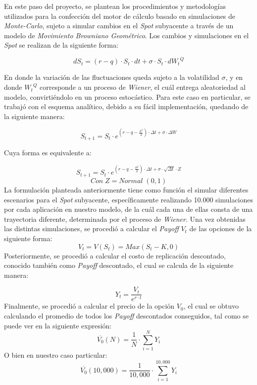 \noindent En este paso del proyecto, se plantean los procedimientos y metodologías utilizados para la confección del motor de cálculo basado en simulaciones de \textit{Monte-Carlo}, sujeto a simular cambios en el \textit{Spot} subyacente a través de un modelo de \textit{Movimiento Browniano Geométrico}. Los cambios y simulaciones en el \textit{Spot} se realizan de la siguiente forma:

\begin{equation}
    dS_t=(r-q)\cdot S_t \cdot dt + \sigma \cdot S_t \cdot d{W_t}^Q
\end{equation}

\noindent En donde la variación de las fluctuaciones queda sujeto a la volatilidad $\sigma$, y en donde ${W_t}^Q$ corresponde a un proceso de \textit{Wiener}, el cuál entrega aleatoriedad al modelo, convirtiéndolo en un proceso estocástico. Para este caso en particular, se trabajó con el esquema analítico, debido a su fácil implementación, quedando de la siguiente manera:

\begin{equation}
    S_{t+1}=S_t \cdot e^{(r-q-\frac{\sigma^2}{2})\cdot \Delta t + \sigma \cdot \Delta W  }
\end{equation}

\noindent Cuya forma es equivalente a:

\begin{equation}
    S_{t+1}=S_t \cdot e^{(r-q-\frac{\sigma^2}{2})\cdot \Delta t + \sigma \cdot \sqrt{\Delta t} \cdot Z }
\end{equation}
\begin{equation*}
    Con \; Z=Normal\;(0,1)
\end{equation*}
\noindent La formulación planteada anteriormente tiene como función el simular diferentes escenarios para el \textit{Spot} subyacente, específicamente realizando 10.000 simulaciones por cada aplicación en nuestro modelo, de la cuál cada una de ellas consta de una trayectoria diferente, determinada por el proceso de \textit{Wiener}. Una vez obtenidas las distintas simulaciones, se procedió a calcular el \textit{Payoff} $V_t$ de las opciones de la siguiente forma:
\begin{equation}
    V_t=V(S_t)=Max(S_t-K,0)
\end{equation}
\noindent Posteriormente, se procedió a calcular el costo de replicación descontado, conocido también como \textit{Payoff} descontado, el cual se calcula de la siguiente manera:

\begin{equation}
    Y_t=\frac{V_t}{e^{r\cdot t}}
\end{equation}
\noindent Finalmente, se procedió a calcular el precio de la opción $V_0$, el cual se obtuvo calculando el promedio de todos los \textit{Payoff} descontados conseguidos, tal como se puede ver en la siguiente expresión:
\begin{equation}
    \overline{V_0}(N)=\frac{1}{N} \cdot \sum_{i=1}^{N}Y_{i} 
\end{equation}
O bien en nuestro caso particular:
\begin{equation*}
    \overline{V_0}(10,000)=\frac{1}{10,000} \cdot \sum_{i=1}^{10,000}Y_{i} 
\end{equation*}
\newpage
